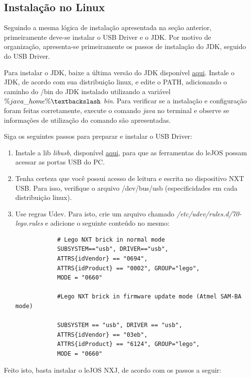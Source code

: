 \subsection{Instalação no Linux} %
\label{sub:instalação_no_linux}

	Seguindo a mesma lógica de instalação apresentada na seção anterior, primeiramente deve-se instalar o USB Driver e o JDK. Por motivo de organização, apresenta-se primeiramente os passos de instalação do JDK, seguido do USB Driver.

	Para instalar o JDK, baixe a última versão do JDK disponível \href{http://www.oracle.com/technetwork/java/}{aqui}. Instale o JDK, de acordo com sua distribuição linux, e edite o PATH, adicionando o caminho do /bin do JDK instalado utilizando a variável \textit{$\%java\_home\% \textbackslash$ bin}. Para verificar se a instalação e configuração foram feitas corretamente, execute o comando \textit{java} no terminal e observe se informações de utilização do comando são apresentadas.

	Siga os seguintes passos para preparar e instalar o USB Driver:

	\begin{enumerate}
		\item Instale a lib \textit{libusb}, disponível \href{http://libusb.sourceforge.net}{aqui}, para que as ferramentas do leJOS possam acessar as portas USB do PC.
		\item  Tenha certeza que você possui acesso de leitura e escrita no dispositivo NXT USB. Para isso, verifique o arquivo /dev/bus/usb (especificidades em cada distribuição linux).
		\item Use regras Udev. Para isto, crie um arquivo chamado \textit{/etc/udev/rules.d/70-lego.rules} e adicione o seguinte conteúdo no mesmo:

		\begin{lstlisting}
			# Lego NXT brick in normal mode
			SUBSYSTEM=="usb", DRIVER=="usb",
			ATTRS{idVendor} == "0694",
			ATTRS{idProduct} == "0002", GROUP="lego",
			MODE = "0660"

			#Lego NXT brick in firmware update mode (Atmel SAM-BA mode)

			SUBSYSTEM == "usb", DRIVER == "usb",
			ATTRS{idVendor} == "03eb",
			ATTRS{idProduct} == "6124", GROUP="lego",
			MODE = "0660"
		\end{lstlisting}
	\end{enumerate}

	Feito isto, basta instalar o leJOS NXJ, de acordo com os passos a seguir:

